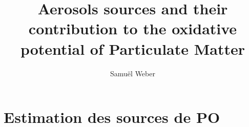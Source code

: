 \documentclass[a4paper,12pt]{book}
\author{Samuël Weber}
\title{Aerosols sources and their contribution to the oxidative potential of Particulate Matter}
\begin{document}
% 
\maketitle

\frontmatter

\clearpage
% 
%

\tableofcontents
\listoftables
\listoffigures


\mainmatter

% 
%
% 
%
% 
%
% 

\chapter{Estimation des sources de PO}
\label{cha:estimation_des_sources_de_PO}
\PartialToc
\clearpage

\clearpage
\printbibliography[segment=\therefsegment,heading=subbibliography]
\end{document}
